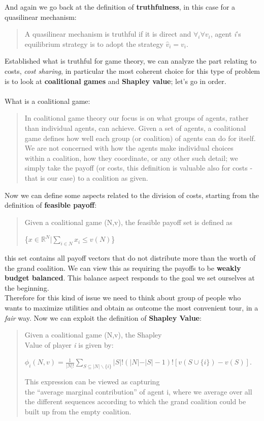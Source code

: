 \documentclass{article}
\begin{document}
{\begin{quote}
\end{quote}
And again we go back at the definition of \textbf{truthfulness}, in this case for a quasilinear mechanism:
\begin{quote}
    A quasilinear mechanism is truthful if it is direct and $\forall _i \forall v_i$, agent \textit{i}'s equilibrium strategy is to adopt the strategy $\hat{v}_i = v_i$.
\end{quote}
Established what is truthful for game theory, we can analyze the part relating to costs, \textit{cost sharing}, in particular the most coherent choice for this type of problem is to look at  \textbf{coalitional games} and \textbf{Shapley value}; let's go in order.\\\\
What is a coalitional game:
\begin{quote}
    In coalitional game theory our focus is on what groups of agents, rather than individual agents, can achieve. Given a set of agents, a coalitional game defines how well each group (or coalition) of agents can do for itself. We are not concerned with how the agents make individual choices \\within a coalition, how they coordinate, or any other such detail; we simply take the payoff (or costs, this definition is valuable also for costs - that is our case) to a coalition as given.
\end{quote}
Now we can define some aspects related to the division of costs, starting from the definition of \textbf{feasible payoff}:
\begin{quote}
    Given a coalitional game (N,v), the feasible payoff set is defined as 
    \begin{center}
        \{$x \in \mathbb{R}^N \vert \sum_{i\in N} x_i \le v(N)$\}
    \end{center}
\end{quote}
this set contains all payoff vectors that do not distribute more than the worth of the grand coalition. We can view this as requiring the payoffs to be \textbf{weakly budget balanced}. This balance aspect responds to the goal we set ourselves at the beginning.
\\Therefore for this kind of issue we need to think about group of people who wants to maximize utilities and obtain as outcome the most convenient tour, in a \textit{fair} way. Now we can exploit the definition of \textbf{Shapley Value}:
\begin{quote}
    Given a coalitional game (N,v), the Shapley \\Value of player \textit{i} is given by:
    \begin{center}
    \normalsize{
        $\phi_i(N,v) = \frac{1}{\vert N \vert !} \displaystyle \sum_{S \subseteq \vert N \vert \backslash \{i\}} \vert S \vert!(\vert N \vert -  \vert S \vert - 1)! [v(S \cup \{i\}) - v(S)]$.
    }
    \end{center}
    This expression can be viewed as capturing \\the “average marginal contribution” of agent i, where we average over all the different sequences according to which the grand coalition could be built up from the empty coalition.
\end{quote}
}
\end{document}
